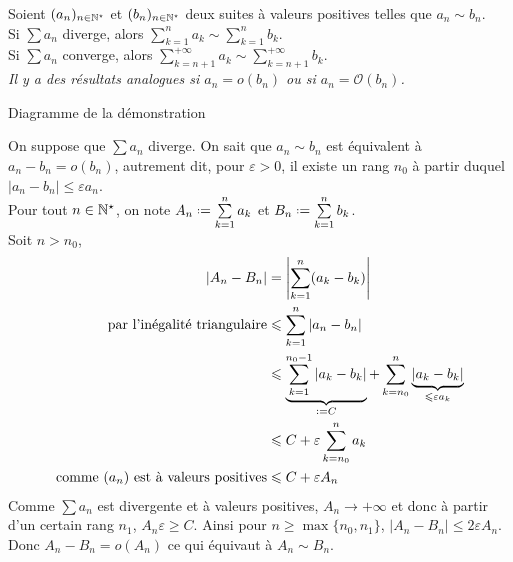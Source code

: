 \begin{prop}{}
    Soient $(a_n)_{n \in \mathbb{N}^\star}$ et $(b_n)_{n \in \mathbb{N}^\star}$ deux suites à valeurs positives telles que $a_n \sim b_n$.\\
    Si $ \sum a_n$ diverge, alors $\sum\limits_{k=1}^{n} a_k \sim \sum\limits_{k=1}^{n} b_k$. \\
    Si $ \sum a_n$ converge, alors $\sum\limits_{k=n+1}^{+ \infty} a_k \sim \sum\limits_{k=n+1}^{+ \infty} b_k$. \\
    \emph{Il y a des résultats analogues si $a_n = o(b_n)$ ou si $a_n = \mathcal{O}(b_n)$.}
\end{prop}

\begin{marginfigure}[3cm]
    \centering
    \caption*{\centering Diagramme de la démonstration}
\end{marginfigure}

\begin{preuve}
    On suppose que $\sum a_n$ diverge. On sait que $a_n \sim b_n$ est équivalent à $a_n -b_n = o(b_n)$, autrement dit, pour $\varepsilon > 0$, il existe un rang $n_0$ à partir duquel $|a_n -b_n| \leqslant \varepsilon a_n$. \\
    Pour tout $n \in \mathbb{N}^\star$, on note $A_n \defeq \sum\limits_{k=1}^n a_k$ et $B_n \defeq \sum\limits_{k=1}^n b_k$. \\
    Soit $n > n_0$,
    \begin{align*}
        |A_n - B_n| &= \left|\sum_{k=1}^n (a_k - b_k) \right| \\
        \text{par l'inégalité triangulaire} &\leqslant \sum_{k=1}^n |a_n-b_n| \\
        &\leqslant \underbrace{\sum_{k=1}^{n_0-1} |a_k - b_k|}_{\defeq C} + \sum_{k=n_0}^n \underbrace{|a_k - b_k|}_{\leqslant \varepsilon a_k} \\
        &\leqslant C + \varepsilon \sum_{k=n_0}^n a_k \\
        \text{comme $(a_n)$ est à valeurs positives} &\leqslant C + \varepsilon A_n
    \end{align*}
    Comme $\sum a_n$ est divergente et à valeurs positives, $A_n \longrightarrow +\infty$ et donc à partir d'un certain rang $n_1$, $A_n \varepsilon \geqslant C$. Ainsi pour $n \geqslant \max \{ n_0, n_1 \}$, $|A_n - B_n| \leqslant 2 \varepsilon A_n$. \\ 
    Donc $A_n - B_n = o(A_n)$ ce qui équivaut à $A_n \sim B_n$.
\end{preuve}
